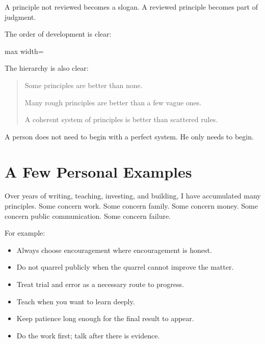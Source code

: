A principle not reviewed becomes a slogan. A reviewed principle becomes part of judgment.

The order of development is clear:

\begin{center}
\begin{adjustbox}{max width=\linewidth}
\end{adjustbox}
\end{center}

The hierarchy is also clear:

\begin{quote}
Some principles are better than none.

Many rough principles are better than a few vague ones.

A coherent system of principles is better than scattered rules.
\end{quote}

A person does not need to begin with a perfect system. He only needs to begin.

\section*{A Few Personal Examples}

Over years of writing, teaching, investing, and building, I have accumulated many principles. Some concern work. Some concern family. Some concern money. Some concern public communication. Some concern failure.

For example:

\begin{itemize}
\item Always choose encouragement where encouragement is honest.
\item Do not quarrel publicly when the quarrel cannot improve the matter.
\item Treat trial and error as a necessary route to progress.
\item Teach when you want to learn deeply.
\item Keep patience long enough for the final result to appear.
\item Do the work first; talk after there is evidence.
\end{itemize}

